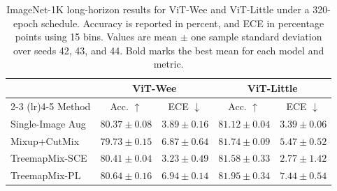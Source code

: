 \begin{table}[t]
  \caption{ImageNet-1K long-horizon results for ViT-Wee and ViT-Little under a 320-epoch schedule. Accuracy is reported in percent, and ECE in percentage points using 15 bins. Values are mean $\pm$ one sample standard deviation over seeds 42, 43, and 44. Bold marks the best mean for each model and metric.}
  \label{tab:in1k-long-horizon-results}
  \centering
  \footnotesize
  \setlength{\tabcolsep}{4pt}
  \begin{tabular}{@{}lcccc@{}}
    \toprule
     & \multicolumn{2}{c}{ViT-Wee} & \multicolumn{2}{c}{ViT-Little} \\
    \cmidrule(lr){2-3} \cmidrule(lr){4-5}
    Method & Acc. $\uparrow$ & ECE $\downarrow$ & Acc. $\uparrow$ & ECE $\downarrow$ \\
    \midrule
    Single-Image Aug & $80.37 \pm 0.08$ & $3.89 \pm 0.16$ & $81.12 \pm 0.04$ & $3.39 \pm 0.06$ \\
    Mixup+CutMix & $79.73 \pm 0.15$ & $6.87 \pm 0.64$ & $81.74 \pm 0.09$ & $5.47 \pm 0.52$ \\
    TreemapMix-SCE & $80.41 \pm 0.04$ & $\mathbf{3.23 \pm 0.49}$ & $81.58 \pm 0.33$ & $\mathbf{2.77 \pm 1.42}$ \\
    TreemapMix-PL & $\mathbf{80.64 \pm 0.16}$ & $6.94 \pm 0.14$ & $\mathbf{81.95 \pm 0.34}$ & $7.44 \pm 0.54$ \\
    \bottomrule
  \end{tabular}
\end{table}
